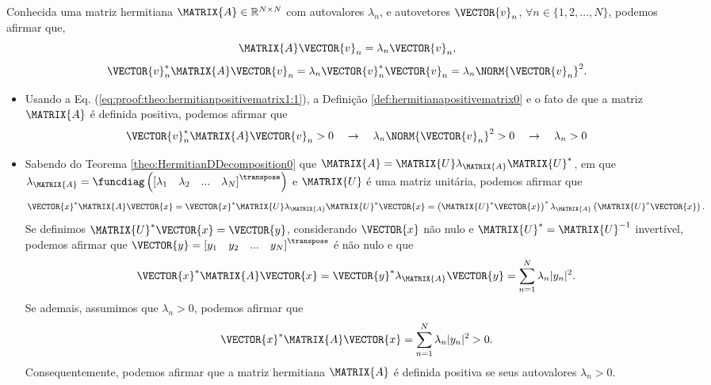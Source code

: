 \begin{myproofT}\label{proof:theo:hermitianpositivematrix1}
Conhecida uma matriz hermitiana $\MATRIX{A} \in \mathbb{R}^{N \times N}$ com  autovalores $\lambda_n$,
e autovetores $\VECTOR{v}_n$, $\forall n \in \{1, 2, ..., N\}$, podemos afirmar que,
\begin{equation}\label{eq:proof:theo:hermitianpositivematrix1:0}
\MATRIX{A}\VECTOR{v}_n=\lambda_n \VECTOR{v}_n,
\end{equation}
\begin{equation}\label{eq:proof:theo:hermitianpositivematrix1:1}
\VECTOR{v}_n^{\ast}\MATRIX{A}\VECTOR{v}_n=
\lambda_n \VECTOR{v}_n^{\ast}\VECTOR{v}_n=
\lambda_n \NORM{\VECTOR{v}_n}^2.
\end{equation}

\begin{itemize}
\item Usando a Eq. (\ref{eq:proof:theo:hermitianpositivematrix1:1}), a 
Definição \ref{def:hermitianapositivematrix0} e o fato de que a matriz $\MATRIX{A}$ é definida positiva,
podemos afirmar que
\begin{equation}
\VECTOR{v}_n^{\ast}\MATRIX{A}\VECTOR{v}_n >0
\quad \rightarrow \quad
\lambda_n \NORM{\VECTOR{v}_n}^2 > 0
\quad \rightarrow \quad
\lambda_n  > 0
\end{equation} 
\item Sabendo do Teorema \ref{theo:HermitianDDecomposition0} que 
$\MATRIX{A}=\MATRIX{U}\lambda_{\MATRIX{A}} \MATRIX{U}^{\ast}$,
em que
$\lambda_{\MATRIX{A}}=\funcdiag\left(\left[\lambda_1\quad \lambda_2 \quad ... \quad \lambda_N \right]^{\transpose}\right)$
e $\MATRIX{U}$ é uma matriz unitária,
podemos afirmar que
\begin{equation}
\VECTOR{x}^{\ast}\MATRIX{A}\VECTOR{x}=
\VECTOR{x}^{\ast}\MATRIX{U}\lambda_{\MATRIX{A}} \MATRIX{U}^{\ast}\VECTOR{x}=
\left(\MATRIX{U}^{\ast}\VECTOR{x}\right)^{\ast}\lambda_{\MATRIX{A}}\left(\MATRIX{U}^{\ast}\VECTOR{x}\right).
\end{equation}
Se definimos $\MATRIX{U}^{\ast}\VECTOR{x}=\VECTOR{y}$, considerando
$\VECTOR{x}$ não nulo e $\MATRIX{U}^{\ast}=\MATRIX{U}^{-1}$ invertível,
podemos afirmar que 
$\VECTOR{y}=\left[y_1\quad y_2 \quad ... \quad y_N \right]^{\transpose}$ é não nulo e que 
\begin{equation}
\VECTOR{x}^{\ast}\MATRIX{A}\VECTOR{x}=
\VECTOR{y}^{\ast}\lambda_{\MATRIX{A}}\VECTOR{y}=\sum_{n=1}^{N}\lambda_n |y_n|^2.
\end{equation}
Se ademais, assumimos que $\lambda_n  > 0$, podemos afirmar que 
\begin{equation}
\VECTOR{x}^{\ast}\MATRIX{A}\VECTOR{x}=\sum_{n=1}^{N}\lambda_n |y_n|^2>0.
\end{equation}
Consequentemente, podemos afirmar que a matriz hermitiana $\MATRIX{A}$
é definida positiva se seus autovalores $\lambda_n  > 0$.
\end{itemize}
\end{myproofT}

